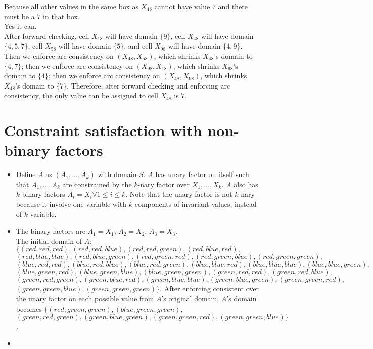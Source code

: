 \documentclass[11pt]{article}
\begin{document}
\begin{onehalfspace}
\begin{itemize}
	Because all other values in the same box as $X_{48}$ cannot have value $7$ and there must be a $7$ in that box.\\
	Yes it can.\\
	After forward checking, cell $X_{18}$ will have domain $\{9\}$, cell $X_{48}$ will have domain $\{4,5,7\}$, cell $X_{58}$ will have domain $\{5\}$, and cell $X_{98}$ will have domain $\{4,9\}$. Then we enforce arc consistency on $(X_{48},X_{58})$, which shrinks $X_{48}$'s domain to $\{4,7\}$; then we enforce arc consistency on $(X_{98},X_{18})$, which shrinks $X_{98}$'s domain to $\{4\}$; then we enforce arc consistency on $(X_{48},X_{98})$, which shrinks $X_{48}$'s domain to $\{7\}$. Therefore, after forward checking and enforcing arc consistency, the only value can be assigned to cell $X_{48}$ is $7$.
\end{itemize}
\section{Constraint satisfaction with non-binary factors}
\begin{itemize}
	\item
	Define $A$ as $(A_1,...,A_k)$ with domain $S$. $A$ has unary factor on itself such that $A_1,...,A_k$ are constrained by the $k$-nary factor over $X_1,...,X_k$. $A$ also has $k$ binary factors $A_i = X_i \forall 1 \leq i \leq k$. Note that the unary factor is not $k$-nary because it involve one variable with $k$ components of invariant values, instead of $k$ variable.\\
	\item
	 The binary factors are $A_1 = X_1$, $A_2 = X_2$, $A_3 = X_3$.\\
	 The initial domain of $A$: $\{(red,red,red),(red,red,blue),(red,red,green),(red,blue,red),$\\$(red,blue,blue),(red,blue,green),(red,green,red),(red,green,blue),(red,green,green),$\\$(blue,red,red),(blue,red,blue),(blue,red,green),(blue,blue,red),(blue,blue,blue),(blue,blue,green),$\\$(blue,green,red),(blue,green,blue),(blue,green,green),(green,red,red),(green,red,blue),$\\$(green,red,green),(green,blue,red),(green,blue,blue),(green,blue,green),(green,green,red),$\\$(green,green,blue),(green,green,green)\}$.
	 After enforcing consistent over the unary factor on each possible value from $A$'s original domain, $A$'s domain becomes $\{(red,green,green),(blue,green,green),$\\$(green,red,green),(green,blue,green),(green,green,red),(green,green,blue)\}$.
	 \item
	 
\end{itemize}
\end{onehalfspace}
\end{document}
